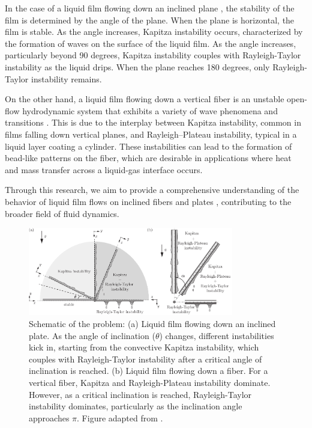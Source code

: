 \documentclass[11pt]{article}
\begin{document}
In the case of a liquid film flowing down an inclined plane \citep{craster2009dynamics}, the stability of the film is determined by the angle of the plane. When the plane is horizontal, the film is stable. As the angle increases, Kapitza instability occurs, characterized by the formation of waves on the surface of the liquid film. As the angle increases, particularly beyond 90 degrees, Kapitza instability couples with Rayleigh-Taylor instability as the liquid drips. When the plane reaches 180 degrees, only Rayleigh-Taylor instability remains.

On the other hand, a liquid film flowing down a vertical fiber is an unstable open-flow hydrodynamic system that exhibits a variety of wave phenomena and transitions \citep{kalliadasis1994drop, quere1999fluid, kliakhandler2001viscous, craster2006viscous}. This is due to the interplay between Kapitza instability, common in films falling down vertical planes, and Rayleigh--Plateau instability, typical in a liquid layer coating a cylinder. These instabilities can lead to the formation of bead-like patterns on the fiber, which are desirable in applications where heat and mass transfer across a liquid-gas interface occurs.

Through this research, we aim to provide a comprehensive understanding of the behavior of liquid film flows on inclined fibers \citep{pour2023experimental} and plates \citep{craster2009dynamics}, contributing to the broader field of fluid dynamics.

\begin{figure}
	\begin{center}
		\includegraphics[width=0.8\textwidth]{schematic_dropsOnFibers.pdf}
		\caption{Schematic of the problem: (a) Liquid film flowing down an inclined plate. As the angle of inclination ($\theta$) changes, different instabilities kick in, starting from the convective Kapitza instability, which couples with Rayleigh-Taylor instability after a critical angle of inclination is reached. (b) Liquid film flowing down a fiber. For a vertical fiber, Kapitza and Rayleigh-Plateau instability dominate. However,  as a critical inclination is reached, Rayleigh-Taylor instability dominates, particularly as the inclination angle approaches $\pi$. Figure adapted from \citet{rietz2017dynamics}.}
		\label{Figure::Typical}
\end{center}
\end{figure}
\end{document}
